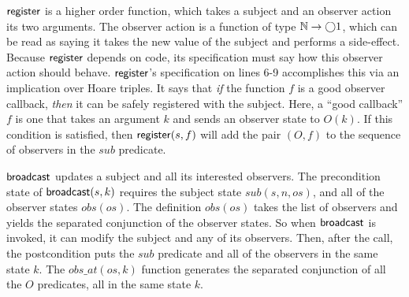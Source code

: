 \documentclass[preprint,natbib]{sigplanconf}
\begin{document}
$\mbox{\textsf{{register}}}$ is a higher order function, which takes a subject
and an observer action its two arguments. The observer action is a
function of type $\mathbb{N} \to \bigcirc{1}$, which can be read as saying it
takes the new value of the subject and performs a side-effect. Because
$\mbox{\textsf{{register}}}$ depends on code, its specification must say how
this observer action should behave. $\mbox{\textsf{{register}}}$'s specification
on lines 6-9 accomplishes this via an implication over Hoare
triples. It says that \emph{if} the function $f$ is a good observer
callback, \emph{then} it can be safely registered with the
subject. Here, a ``good callback'' $f$ is one that takes an argument
$k$ and sends an observer state to $O(k)$. If this condition is
satisfied, then $\mbox{\textsf{{register}}}(s, f)$ will add the pair $(O,f)$ to
the sequence of observers in the $sub$ predicate.

$\mbox{\textsf{{broadcast}}}$ updates a subject and all its interested
observers.  The precondition state of $\mbox{\textsf{{broadcast}}}(s,k)$
requires the subject state $sub(s,n,os)$, and all of the observer
states $obs(os)$. The definition $obs(os)$ takes the list of observers
and yields the separated conjunction of the observer states. So when
$\mbox{\textsf{{broadcast}}}$ is invoked, it can modify the subject and any of
its observers. Then, after the call, the postcondition puts the $sub$
predicate and all of the observers in the same state $k$. The
$obs\_at(os,k)$ function generates the separated conjunction of all
the $O$ predicates, all in the same state $k$.
\end{document}
